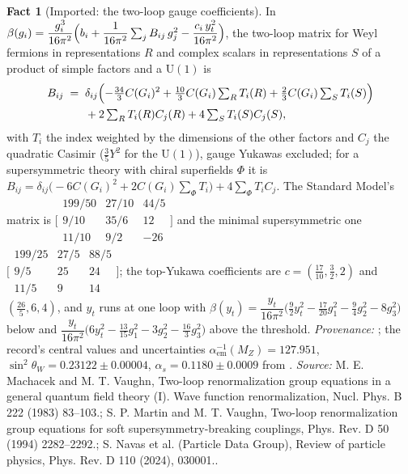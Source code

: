 \documentclass[11pt]{article}
\theoremstyle{definition}
\newtheorem{fact}[theorem]{Fact}
\theoremstyle{plain}
\begin{document}
\begin{fact}[Imported: the two-loop gauge coefficients]\label{c:standard-model.imported-two-loop-gauge-coefficients}
In $\beta(g_{i}) = \dfrac{g_{i}^{3}}{16\pi^{2}}\Bigl(b_{i} + \dfrac{1}{16\pi^{2}}\sum_{j} B_{ij}\,g_{j}^{2} - \dfrac{c_{i}\,y_{t}^{2}}{16\pi^{2}}\Bigr)$, the two-loop matrix for Weyl fermions in representations $R$ and complex scalars in representations $S$ of a product of simple factors and a $\mathrm{U}(1)$ is
\begin{align*}
B_{ij} \;=\; {}& \delta_{ij}\Bigl(-\tfrac{34}{3}C(G_{i})^{2} + \tfrac{10}{3}C(G_{i})\textstyle\sum_{R} T_{i}(R) + \tfrac{2}{3}C(G_{i})\sum_{S} T_{i}(S)\Bigr) \\
& + 2\textstyle\sum_{R} T_{i}(R)C_{j}(R) + 4\sum_{S} T_{i}(S)C_{j}(S),
\end{align*}
with $T_{i}$ the index weighted by the dimensions of the other factors and $C_{j}$ the quadratic Casimir ($\tfrac35 Y^{2}$ for the $\mathrm{U}(1)$), gauge Yukawas excluded; for a supersymmetric theory with chiral superfields $\Phi$ it is $B_{ij} = \delta_{ij}\bigl(-6C(G_{i})^{2} + 2C(G_{i})\sum_{\Phi} T_{i}\bigr) + 4\sum_{\Phi} T_{i}C_{j}$. The Standard Model's matrix is $\bigl[\begin{smallmatrix} 199/50 & 27/10 & 44/5 \\ 9/10 & 35/6 & 12 \\ 11/10 & 9/2 & -26 \end{smallmatrix}\bigr]$ and the minimal supersymmetric one $\bigl[\begin{smallmatrix} 199/25 & 27/5 & 88/5 \\ 9/5 & 25 & 24 \\ 11/5 & 9 & 14 \end{smallmatrix}\bigr]$; the top-Yukawa coefficients are $c = (\tfrac{17}{10}, \tfrac32, 2)$ and $(\tfrac{26}{5}, 6, 4)$, and $y_{t}$ runs at one loop with $\beta(y_{t}) = \dfrac{y_{t}}{16\pi^{2}}\bigl(\tfrac92 y_{t}^{2} - \tfrac{17}{20}g_{1}^{2} - \tfrac94 g_{2}^{2} - 8g_{3}^{2}\bigr)$ below and $\dfrac{y_{t}}{16\pi^{2}}\bigl(6y_{t}^{2} - \tfrac{13}{15}g_{1}^{2} - 3g_{2}^{2} - \tfrac{16}{3}g_{3}^{2}\bigr)$ above the threshold. \emph{Provenance:} \cite{MachacekVaughn1983, MartinVaughn1994}; the record's central values and uncertainties $\alpha^{-1}_{\mathrm{em}}(M_{Z}) = 127.951$, $\sin^{2}\theta_{W} = 0.23122 \pm 0.00004$, $\alpha_{s} = 0.1180 \pm 0.0009$ from \cite{PDG2024}.
\emph{Source:} M. E. Machacek and M. T. Vaughn, Two-loop renormalization group equations in a general quantum field theory (I). Wave function renormalization, Nucl. Phys. B 222 (1983) 83--103.; S. P. Martin and M. T. Vaughn, Two-loop renormalization group equations for soft supersymmetry-breaking couplings, Phys. Rev. D 50 (1994) 2282--2292.; S. Navas et al. (Particle Data Group), Review of particle physics, Phys. Rev. D 110 (2024), 030001..
\end{fact}
\end{document}
